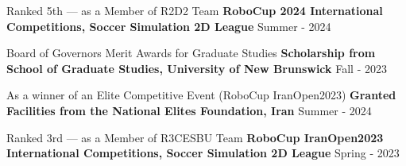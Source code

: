 \begin{cventries}
    
    \cventry
    {Ranked 5th — as a Member of R2D2 Team}
    {\textbf {RoboCup 2024 International Competitions, Soccer Simulation 2D League}}
    {}
    {Summer - 2024}
    {}
    
    
    \cventry
    {Board of Governors Merit Awards for Graduate Studies}
    {\textbf {Scholarship from School of Graduate Studies, University of New Brunswick}}
    {}
    {Fall - 2023}
    {}

    \cventry
    {As a winner of an Elite Competitive Event (RoboCup IranOpen2023)}
    {\textbf {Granted Facilities from the National Elites Foundation, Iran}}
    {}
    {Summer - 2024}
    {}


    \cventry
    {Ranked 3rd — as a Member of R3CESBU Team}
    {\textbf {RoboCup IranOpen2023 International Competitions, Soccer Simulation 2D League}}
    {}
    {Spring - 2023}
    {}

    

    




\end{cventries}